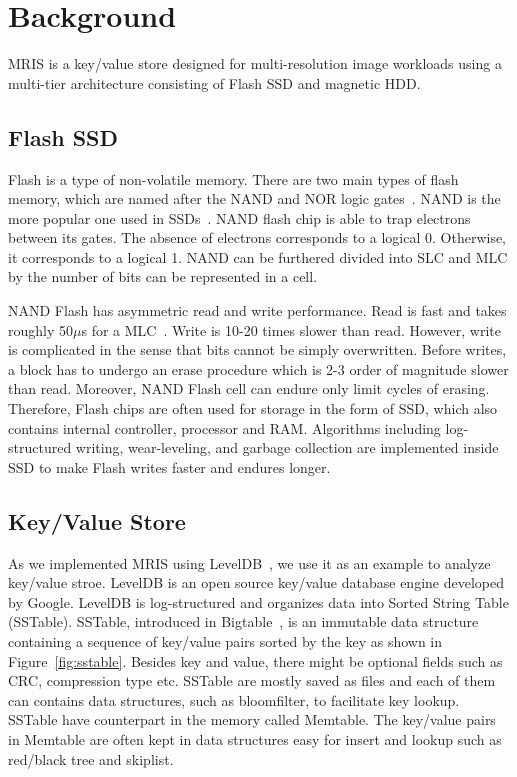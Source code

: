 \section{Background}
\label{sec:bg}

MRIS is a key/value store designed for multi-resolution image
workloads using a multi-tier architecture consisting of Flash SSD and
magnetic HDD.

\subsection{Flash SSD}
Flash is a type of non-volatile memory. There are two main types of
flash memory, which are named after the NAND and NOR logic
gates~\cite{flashwiki}. NAND is the more popular one used in
SSDs~\cite{ssdanatomy}.  NAND flash chip is able to trap electrons
between its gates. The absence of electrons corresponds to a logical
0. Otherwise, it corresponds to a logical 1. NAND can be furthered
divided into SLC and MLC by the number of bits can be represented in a
cell.

NAND Flash has asymmetric read and write performance. Read is fast and
takes roughly 50$\mu$s for a MLC~\cite{ssdanatomy}. Write is 10-20
times slower than read. However, write is complicated in the sense
that bits cannot be simply overwritten. Before writes, a block has to
undergo an erase procedure which is 2-3 order of magnitude slower than
read. Moreover, NAND Flash cell can endure only limit cycles of
erasing. Therefore, Flash chips are often used for storage in the form
of SSD, which also contains internal controller, processor and RAM.
Algorithms including log-structured writing, wear-leveling, and
garbage collection are implemented inside SSD to make Flash writes
faster and endures longer.

\subsection{Key/Value Store}
As we implemented MRIS using LevelDB~\cite{leveldb-web}, we use it as
an example to analyze key/value stroe. LevelDB is an open source
key/value database engine developed by Google. LevelDB is
log-structured and organizes data into Sorted String Table (SSTable).
SSTable, introduced in Bigtable~\cite{chang06osdi}, is an immutable
data structure containing a sequence of key/value pairs sorted by the
key as shown in Figure~\ref{fig:sstable}. Besides key and value, there
might be optional fields such as CRC, compression type etc. SSTable
are mostly saved as files and each of them can contains data
structures, such as bloomfilter, to facilitate key lookup. SSTable
have counterpart in the memory called Memtable. The key/value pairs in
Memtable are often kept in data structures easy for insert and lookup
such as red/black tree and skiplist.

